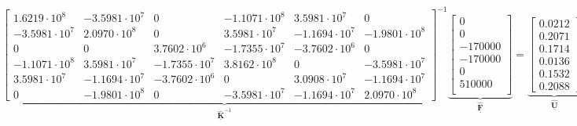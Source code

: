 \documentclass[12pt,a4paper]{article}
\def\vec#1{\underline{\mathbf{#1}}}
\def\m{\; \left[\mathrm{m}\right]}
\begin{document}
{\tiny
\begin{equation}
    \underbrace{
    \begin{bmatrix}
        1.6219 \cdot 10^{8}  & -3.5981 \cdot 10^{7} & 0                    & -1.1071 \cdot 10^{8} & 3.5981 \cdot 10^{7}  & 0                    \\
        -3.5981 \cdot 10^{7} & 2.0970 \cdot 10^{8}  & 0                    & 3.5981 \cdot 10^{7}  & -1.1694 \cdot 10^{7} & -1.9801 \cdot 10^{8} \\
        0                    & 0                    & 3.7602 \cdot 10^{6}  & -1.7355 \cdot 10^{7} & -3.7602 \cdot 10^{6} & 0                    \\
        -1.1071 \cdot 10^{8} & 3.5981 \cdot 10^{7}  & -1.7355\cdot 10^{7}  & 3.8162 \cdot 10^{8}  & 0                    & -3.5981 \cdot 10^{7} \\
        3.5981 \cdot 10^{7}  & -1.1694 \cdot 10^{7} & -3.7602 \cdot 10^{6} & 0                    & 3.0908 \cdot 10^{7}  & -1.1694 \cdot 10^{7} \\
        0                    & -1.9801 \cdot 10^{8} & 0                    & -3.5981 \cdot 10^{7} & -1.1694 \cdot 10^{7} & 2.0970 \cdot 10^{8}
    \end{bmatrix}^{-1}}_{\vec{\hat{K}}^{-1}}
    \underbrace{\begin{bmatrix}
            0       \\
            0       \\
            -170000 \\
            -170000 \\
            0       \\
            510000  \\
        \end{bmatrix}}_{\vec{\hat{F}}}=
    \underbrace{\begin{bmatrix}
            0.0212 \\
            0.2071 \\
            0.1714 \\
            0.0136 \\
            0.1532 \\
            0.2088
        \end{bmatrix}}_{\vec{\hat{U}}} \m
\end{equation}}
\end{document}
